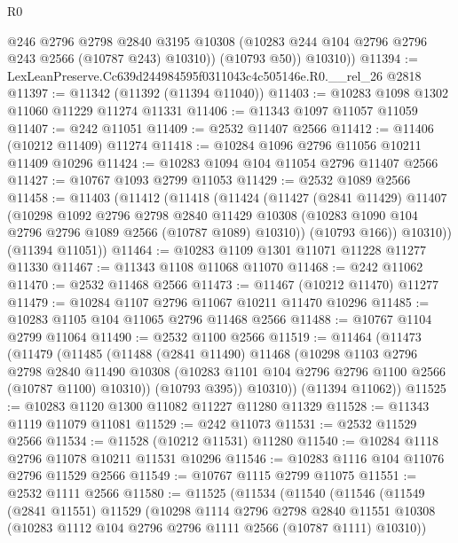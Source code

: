 \begin{lexlean}{R0}
\begin{coremodule}
            @246
            @2796
            @2798
            @2840
            @3195
            @10308
            (@10283 @244 @104 @2796 @2796 @243 @2566 (@10787 @243) @10310))
          (@10793 @50))
        @10310))
@11394 := LexLeanPreserve.Cc639d244984595f0311043c4c505146e.R0.__rel_26 @2818
@11397 := @11342 (@11392 (@11394 @11040))
@11403 := @10283 @1098 @1302 @11060 @11229 @11274 @11331
@11406 := @11343 @1097 @11057 @11059
@11407 := @242 @11051
@11409 := @2532 @11407 @2566
@11412 := @11406 (@10212 @11409) @11274
@11418 := @10284 @1096 @2796 @11056 @10211 @11409 @10296
@11424 := @10283 @1094 @104 @11054 @2796 @11407 @2566
@11427 := @10767 @1093 @2799 @11053
@11429 := @2532 @1089 @2566
@11458 := @11403
    (@11412
      (@11418
        (@11424
          (@11427
            (@2841 @11429)
            @11407
            (@10298
              @1092
              @2796
              @2798
              @2840
              @11429
              @10308
              (@10283 @1090 @104 @2796 @2796 @1089 @2566 (@10787 @1089) @10310))
            (@10793 @166))
          @10310))
      (@11394 @11051))
@11464 := @10283 @1109 @1301 @11071 @11228 @11277 @11330
@11467 := @11343 @1108 @11068 @11070
@11468 := @242 @11062
@11470 := @2532 @11468 @2566
@11473 := @11467 (@10212 @11470) @11277
@11479 := @10284 @1107 @2796 @11067 @10211 @11470 @10296
@11485 := @10283 @1105 @104 @11065 @2796 @11468 @2566
@11488 := @10767 @1104 @2799 @11064
@11490 := @2532 @1100 @2566
@11519 := @11464
    (@11473
      (@11479
        (@11485
          (@11488
            (@2841 @11490)
            @11468
            (@10298
              @1103
              @2796
              @2798
              @2840
              @11490
              @10308
              (@10283 @1101 @104 @2796 @2796 @1100 @2566 (@10787 @1100) @10310))
            (@10793 @395))
          @10310))
      (@11394 @11062))
@11525 := @10283 @1120 @1300 @11082 @11227 @11280 @11329
@11528 := @11343 @1119 @11079 @11081
@11529 := @242 @11073
@11531 := @2532 @11529 @2566
@11534 := @11528 (@10212 @11531) @11280
@11540 := @10284 @1118 @2796 @11078 @10211 @11531 @10296
@11546 := @10283 @1116 @104 @11076 @2796 @11529 @2566
@11549 := @10767 @1115 @2799 @11075
@11551 := @2532 @1111 @2566
@11580 := @11525
    (@11534
      (@11540
        (@11546
          (@11549
            (@2841 @11551)
            @11529
            (@10298
              @1114
              @2796
              @2798
              @2840
              @11551
              @10308
              (@10283 @1112 @104 @2796 @2796 @1111 @2566 (@10787 @1111) @10310))

\end{coremodule}
\end{lexlean}
